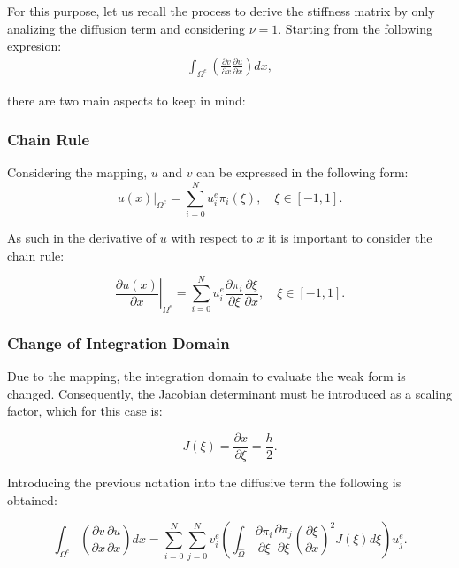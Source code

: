 \documentclass[
  a4paper,
  10pt]{article}
\begin{document}
For this purpose, let us recall the process to derive the stiffness
matrix by only analizing the diffusion term and considering \(\nu=1\).
Starting from the following expresion: \begin{align}
\int_{\Omega^{e}} ( \frac{\partial v}{\partial x}\frac{\partial u}{\partial x})dx,
\end{align}

there are two main aspects to keep in mind:

\hypertarget{chain-rule}{%
\subsubsection{Chain Rule}\label{chain-rule}}

Considering the mapping, \(u\) and \(v\) can be expressed in the
following form: \begin{equation}
\left.u(x)\right\rvert_{\Omega^{e}}=\sum_{i=0}^{N}u_{i}^{e} \pi_{i}(\xi),  \quad \xi \in [-1,1].
\end{equation}

As such in the derivative of \(u\) with respect to \(x\) it is important
to consider the chain rule:

\begin{equation}
\left. \frac{\partial u(x)}{\partial x}\right\rvert_{\Omega^{e}}=\sum_{i=0}^{N} u_{i}^{e} \frac{\partial \pi_{i}}{\partial\xi}\frac{\partial\xi}{\partial x},  \quad \xi \in [-1,1].
\end{equation}

\hypertarget{change-of-integration-domain}{%
\subsubsection{Change of Integration
Domain}\label{change-of-integration-domain}}

Due to the mapping, the integration domain to evaluate the weak form
is changed. Consequently, the Jacobian determinant must be
introduced as a scaling factor, which for this case is:

\begin{equation}
J(\xi)=\frac{\partial x}{\partial \xi}=\frac{h}{2}.
\end{equation}

Introducing the previous notation into the diffusive term the following
is obtained:

\begin{equation}
\int_{\Omega^{e}} ( \frac{\partial v}{\partial x}\frac{\partial u}{\partial x})dx = \sum_{i=0}^{N}\sum_{j=0}^{N} v_i^{e}( \int_{\hat{\Omega}}\frac{\partial \pi_{i}}{\partial\xi}\frac{\partial \pi_{j}}{\partial\xi}(\frac{\partial\xi}{\partial x})^{2} J(\xi) d\xi)u_j^{e}.
\end{equation}
\end{document}
